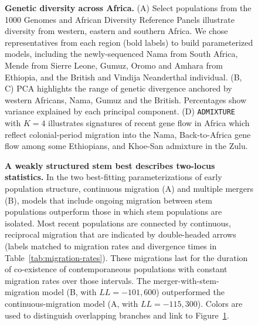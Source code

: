 \documentclass[]{article}
\begin{document}
\begin{figure}[ht!]
    \centering
    \caption[width=\textwidth]{
        \textbf{Genetic diversity across Africa.}
        (A) Select populations from the 1000 Genomes and African Diversity Reference Panels
        illustrate diversity from western, eastern and southern Africa.
        We chose representatives from each region (bold labels)
        to build parameterized models,
        including the newly-sequenced Nama from South Africa, Mende
        from Sierre Leone, Gumuz, Oromo and Amhara from Ethiopia, and the
        British and Vindija Neanderthal individual.
        (B, C) PCA highlights the range of genetic divergence anchored 
        by western Africans, Nama, Gumuz and the British.
        Percentages show variance explained by each principal component.
        (D) \texttt{ADMIXTURE} with $K=4$ illustrates signatures of recent gene flow in Africa
        which reflect colonial-period migration into the Nama,
        Back-to-Africa gene flow among some Ethiopians, and Khoe-San admixture in the Zulu.
    }
    \label{fig:diversity}
\end{figure}
 
\begin{figure}[t!]
    \centering
    \caption{
        \textbf{A weakly structured stem best describes two-locus statistics.}
        In the two best-fitting parameterizations of early population structure,
        continuous migration (A) and multiple mergers (B), models
        that include ongoing migration between stem populations outperform
        those in which stem populations are isolated. Most recent populations are
        connected by continuous, reciprocal migration that are indicated by 
        double-headed arrows (labels matched to migration rates and divergence
        times in Table~\ref{tab:migration-rates}). These migrations last for the
        duration of co-existence of contemporaneous populations with constant
        migration rates over those intervals. The
        merger-with-stem-migration model (B, with  $LL=-101,600$) outperformed the
        continuous-migration model (A, with $LL=-115,300$).
        Colors are used to distinguish overlapping branches and link to
        Figure~\ref{fig:diversity}.}
    \label{fig:best-fit-models}
\end{figure}
\end{document}

